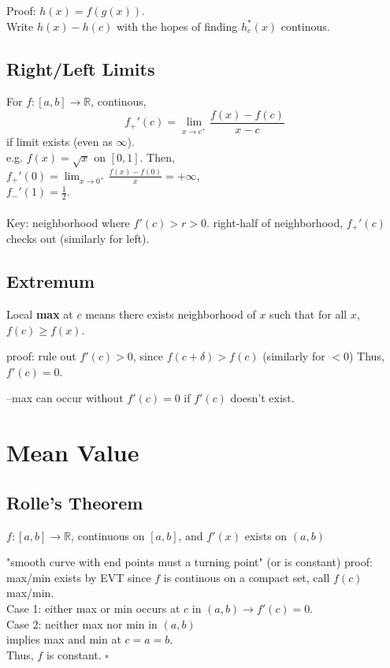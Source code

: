 \documentclass[12pt]{article}
\newcommand{\gray}[1]{\textcolor[gray]{0.5}{#1}} %
\begin{document}
\textcolor[gray]{0.5}{
Proof: $h(x) = f(g(x))$.\\
Write $h(x) - h(c)$ with the hopes of finding $h_c^*(x)$ continous.
}

\subsection*{Right/Left Limits}
For $f: [a, b] \rightarrow \mathbb{R}$, continous, 
$$f_+'(c) = \lim_{x \rightarrow c^+} \frac{f(x) - f(c)}{x - c}$$
if limit exists (even as $\infty$).\\

e.g. $f(x) = \sqrt{x}$ on $[0, 1]$. Then, \\
$f_+'(0) = \lim_{x \rightarrow 0^+} \frac{f(x) - f(0)}{x} = +\infty$, \\
$f_-'(1) = \frac{1}{2}$.\\

\\
\textcolor[gray]{0.5}{Key: neighborhood where $f'(c) > r > 0$. 
right-half of neighborhood, $f_+'(c)$ checks out (similarly for left).}


\subsection*{Extremum}
Local \textbf{max} at $c$ means there exists neighborhood of $x$ such that for all $x$, $f(c) \geq f(x)$.\\

\centerline{} 
\gray{proof: rule out $f'(c) > 0$, since $f(c+\delta) > f(c)$ (similarly for $<0$) Thus, $f'(c) = 0$.}

--max can occur without $f'(c) =0$ if $f'(c)$ doesn't exist.
\section{Mean Value}
\subsection*{Rolle's Theorem}

$f: [a, b] \rightarrow \mathbb{R}$, continuous on $[a, b]$, and $f'(x)$ exists on $(a, b)$\\

\centerline{}
"smooth curve with end points must a turning point" (or is constant)
\textcolor[gray]{0.5}{proof: \\
max/min exists by EVT since $f$ is continous on a compact set, call $f(c)$ max/min.\\
Case 1: either max or min occurs at $c$ in $(a, b) \rightarrow f'(c) = 0$. \\
Case 2: neither max nor min in $(a, b)$\\
implies max and min at $c = a = b$.\\
Thus, $f$ is constant. $\square$\\
}
\end{document}
